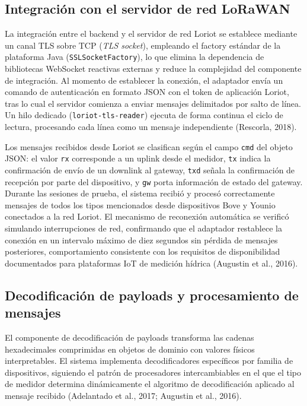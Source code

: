 \documentclass[12pt,a4paper,oneside]{report}
\begin{document}
\subsection{Integración con el servidor de red LoRaWAN}

La integración entre el backend y el servidor de red Loriot se establece mediante un canal TLS sobre TCP (\textit{TLS socket}), empleando el factory estándar de la plataforma Java (\texttt{SSLSocketFactory}), lo que elimina la dependencia de bibliotecas WebSocket reactivas externas y reduce la complejidad del componente de integración. Al momento de establecer la conexión, el adaptador envía un comando de autenticación en formato JSON con el token de aplicación Loriot, tras lo cual el servidor comienza a enviar mensajes delimitados por salto de línea. Un hilo dedicado (\texttt{loriot-tls-reader}) ejecuta de forma continua el ciclo de lectura, procesando cada línea como un mensaje independiente (Rescorla, 2018).

Los mensajes recibidos desde Loriot se clasifican según el campo \texttt{cmd} del objeto JSON: el valor \texttt{rx} corresponde a un uplink desde el medidor, \texttt{tx} indica la confirmación de envío de un downlink al gateway, \texttt{txd} señala la confirmación de recepción por parte del dispositivo, y \texttt{gw} porta información de estado del gateway. Durante las sesiones de prueba, el sistema recibió y procesó correctamente mensajes de todos los tipos mencionados desde dispositivos Bove y Younio conectados a la red Loriot. El mecanismo de reconexión automática se verificó simulando interrupciones de red, confirmando que el adaptador restablece la conexión en un intervalo máximo de diez segundos sin pérdida de mensajes posteriores, comportamiento consistente con los requisitos de disponibilidad documentados para plataformas IoT de medición hídrica (Augustin et al., 2016).

\subsection{Decodificación de payloads y procesamiento de mensajes}

El componente de decodificación de payloads transforma las cadenas hexadecimales comprimidas en objetos de dominio con valores físicos interpretables. El sistema implementa decodificadores específicos por familia de dispositivos, siguiendo el patrón de procesadores intercambiables en el que el tipo de medidor determina dinámicamente el algoritmo de decodificación aplicado al mensaje recibido (Adelantado et al., 2017; Augustin et al., 2016).
\end{document}
